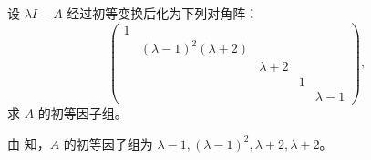 \documentclass[../../main.tex]{subfiles}%
\begin{document}
\begin{example}
设 $\lambda I - A$ 经过初等变换后化为下列对角阵：
\[
\begin{pmatrix}
1 & & & & \\
& (\lambda - 1)^2(\lambda + 2) & & & \\
& & \lambda + 2 & & \\
& & & 1 & \\
& & & & \lambda - 1
\end{pmatrix},
\]
求 $A$ 的初等因子组。
\end{example}
\begin{solution}

由 知，$A$ 的初等因子组为 $\lambda - 1,(\lambda - 1)^2,\lambda + 2,\lambda + 2$。

\end{solution}
\end{document}
